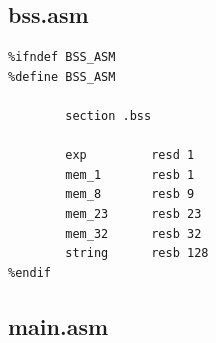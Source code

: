 \documentclass{article}
\begin{document}
	\subsection{bss.asm}
	\begin{verbatim}
%ifndef BSS_ASM
%define BSS_ASM

        section .bss

        exp         resd 1
        mem_1       resb 1
        mem_8       resb 9
        mem_23      resb 23
        mem_32      resb 32
        string      resb 128
%endif

	\end{verbatim}


	\subsection{main.asm}
\end{document}
